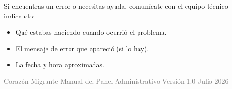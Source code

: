 \documentclass[12pt,a4paper]{article}
\begin{document}
Si encuentras un error o necesitas ayuda, comunícate con el equipo técnico
indicando:
\begin{itemize}
  \item Qué estabas haciendo cuando ocurrió el problema.
  \item El mensaje de error que apareció (si lo hay).
  \item La fecha y hora aproximadas.
\end{itemize}

\vfill
\begin{center}
  \textcolor{grayText}{\small
    Corazón Migrante \textperiodcentered{} Manual del Panel Administrativo \textperiodcentered{} Versión 1.0 \textperiodcentered{} Julio 2026
  }
\end{center}
\end{document}
